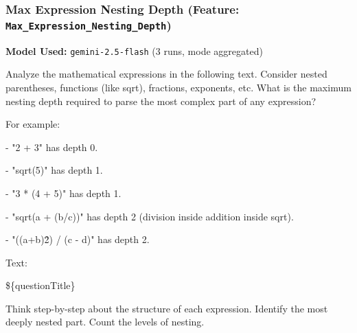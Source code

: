\documentclass[
    a4paper, %
    10pt, %
    twoside, %
]{LTJournalArticle}
\begin{document}
\subsubsection{Max Expression Nesting Depth (Feature: \texttt{Max\_Expression\_Nesting\_Depth})}
\label{app:prompt_nesting_depth}
\textbf{Model Used:} \texttt{gemini-2.5-flash} (3 runs, mode aggregated)
\begin{promptbox}
Analyze the mathematical expressions in the following text. Consider nested parentheses, functions (like sqrt), fractions, exponents, etc. What is the maximum nesting depth required to parse the most complex part of any expression?

\vspace{1em}

For example:

- "2 + 3" has depth 0.

- "sqrt(5)" has depth 1.

- "3 * (4 + 5)" has depth 1.

- "sqrt(a + (b/c))" has depth 2 (division inside addition inside sqrt).

- "((a+b)\^2) / (c - d)" has depth 2.

\vspace{1em}

Text:

\$\{questionTitle\}

\vspace{1em}

Think step-by-step about the structure of each expression. Identify the most deeply nested part. Count the levels of nesting.
\end{promptbox}
\end{document}

